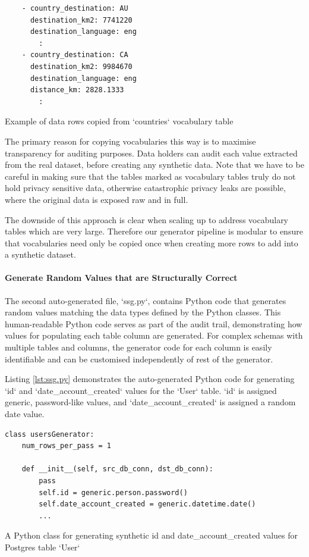 \documentclass[11pt]{article}
\begin{document}
\begin{listing}[H]
\begin{verbatim}
    - country_destination: AU
      destination_km2: 7741220
      destination_language: eng
        :
    - country_destination: CA
      destination_km2: 9984670
      destination_language: eng
      distance_km: 2828.1333
        :
\end{verbatim}
\caption{Example of data rows copied from `countries` vocabulary table}
\label{lst:countries.yaml}
\end{listing}

The primary reason for copying vocabularies this way is to maximise transparency for auditing purposes. Data holders can audit each value extracted from the real dataset, before creating any synthetic data. Note that we have to be careful in making sure that the tables marked as vocabulary tables truly do not hold privacy sensitive data, otherwise catastrophic privacy leaks are possible, where the original data is exposed raw and in full. 

The downside of this approach is clear when scaling up to address vocabulary tables which are very large. Therefore our generator pipeline is modular to ensure that vocabularies need only be copied once when creating more rows to add into a synthetic dataset. 

\paragraph{Generate Random Values that are Structurally Correct}

The second auto-generated file, `ssg.py`, contains Python code that generates random values matching the data types defined by the Python classes. This human-readable Python code serves as part of the audit trail, demonstrating how values for populating each table column are generated. For complex schemas with multiple tables and columns, the generator code for each column is easily identifiable and can be customised independently of rest of the generator. 

Listing \ref{lst:ssg.py} demonstrates the auto-generated Python code for generating `id` and `date\_account\_created` values for the `User` table. `id` is assigned generic, password-like values, and `date\_account\_created` is assigned a random date value.

\begin{listing}[H]
\begin{verbatim}
class usersGenerator:
    num_rows_per_pass = 1

    def __init__(self, src_db_conn, dst_db_conn):
        pass
        self.id = generic.person.password()
        self.date_account_created = generic.datetime.date()
        ...
\end{verbatim}
\caption{A Python class for generating synthetic id and date\_account\_created values for Postgres table `User`}
\label{lst:ssg.py}
\end{listing}
\end{document}
